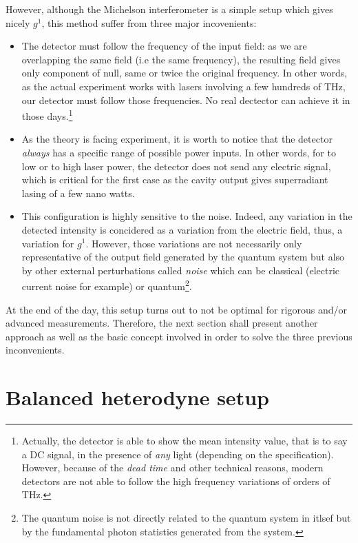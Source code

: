 \documentclass[11pt]{report}
\begin{document}
However, although the Michelson interferometer is a simple setup which gives nicely $g^1$, this method suffer from three major incovenients:
\begin{itemize}
	\item The detector must follow the frequency of the input field: as we are overlapping the same field (i.e the same frequency), the resulting field gives only component of null, same or twice the original frequency. In other words, as the actual experiment works with lasers involving a few hundreds of THz, our detector must follow those frequencies. No real dectector can achieve it in those days.\footnote{Actually, the detector is able to show the mean intensity value, that is to say a DC signal, in the presence of \textit{any} light (depending on the specification). However, because of the \textit{dead time} and other technical reasons, modern detectors are not able to follow the high frequency variations of orders of THz.}
	\item As the theory is facing experiment, it is worth to notice that the detector \textit{always} has a specific range of possible power inputs. In other words, for to low or to high laser power, the detector does not send any electric signal, which is critical for the first case as the cavity output gives superradiant lasing of a few nano watts.
	\item This configuration is highly sensitive to the noise. Indeed, any variation in the detected intensity is concidered as a variation from the electric field, thus, a variation for $g^1$. However, those variations are not necessarily only representative of the output field generated by the quantum system but also by other external perturbations called \textit{noise} which can be classical (electric current noise for example) or quantum\footnote{The quantum noise is not directly related to the quantum system in itlsef but by the fundamental photon statistics generated from the system.}.
\end{itemize}

At the end of the day, this setup turns out to not be optimal for rigorous and/or advanced measurements. Therefore, the next section shall present another approach as well as the basic concept involved in order to solve the three previous inconvenients.

\section{Balanced heterodyne setup}
\end{document}
